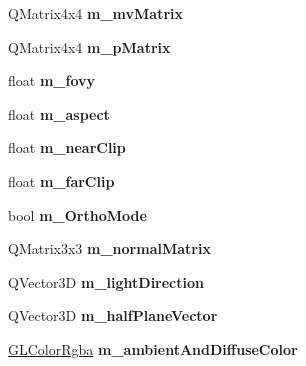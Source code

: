 \begin{DoxyCompactItemize}
\item 
\mbox{\label{class_g_l_e_s_renderer_a2f8a5b98999a5ee14551a39e5f005389}} 
Q\+Matrix4x4 {\bfseries m\+\_\+mv\+Matrix}
\item 
\mbox{\label{class_g_l_e_s_renderer_a2fe2ba5157fa87a9eca8eb15f8097fb5}} 
Q\+Matrix4x4 {\bfseries m\+\_\+p\+Matrix}
\item 
\mbox{\label{class_g_l_e_s_renderer_abd7cabc787ad5c787b54ed2d47412df8}} 
float {\bfseries m\+\_\+fovy}
\item 
\mbox{\label{class_g_l_e_s_renderer_a719e99de6bb7e5af3a5fcae041fdefda}} 
float {\bfseries m\+\_\+aspect}
\item 
\mbox{\label{class_g_l_e_s_renderer_ab29bf2e72c2d91883b1ad3f3e8351940}} 
float {\bfseries m\+\_\+near\+Clip}
\item 
\mbox{\label{class_g_l_e_s_renderer_a6ecd1dee12a4592f35d097e14f90933b}} 
float {\bfseries m\+\_\+far\+Clip}
\item 
\mbox{\label{class_g_l_e_s_renderer_a78662dcb0fedf7710a57345d3d684b85}} 
bool {\bfseries m\+\_\+\+Ortho\+Mode}
\item 
\mbox{\label{class_g_l_e_s_renderer_a76ff9b2803ac2a897d9df0cf587601ed}} 
Q\+Matrix3x3 {\bfseries m\+\_\+normal\+Matrix}
\item 
\mbox{\label{class_g_l_e_s_renderer_a7347241a0f6482d69479d10848c70238}} 
Q\+Vector3D {\bfseries m\+\_\+light\+Direction}
\item 
\mbox{\label{class_g_l_e_s_renderer_ae3feaa98657e57bbc795a845dfafe1fe}} 
Q\+Vector3D {\bfseries m\+\_\+half\+Plane\+Vector}
\item 
\mbox{\label{class_g_l_e_s_renderer_af4b3fcfa029b28bfdd9d2b7bb9202796}} 
\mbox{\hyperlink{class_g_l_color_rgba}{G\+L\+Color\+Rgba}} {\bfseries m\+\_\+ambient\+And\+Diffuse\+Color}
\item 

\end{DoxyCompactItemize}
